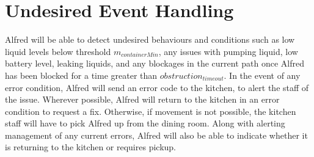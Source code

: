 \documentclass [10pt]{article}
\begin{document}
\section{Undesired Event Handling}
Alfred will be able to detect undesired behaviours and conditions such as low liquid levels below threshold $ m_{containerMin} $, any issues with pumping liquid, low battery level, leaking liquids, and any blockages in the current path once Alfred has been blocked for a time greater than $ obstruction_{timeout} $. In the event of any error condition, Alfred will send an error code to the kitchen, to alert the staff of the issue. Wherever possible, Alfred will return to the kitchen in an error condition to request a fix. Otherwise, if movement is not possible, the kitchen staff will have to pick Alfred up from the dining room. Along with alerting management of any current errors, Alfred will also be able to indicate whether it is returning to the kitchen or requires pickup.
\end{document}
